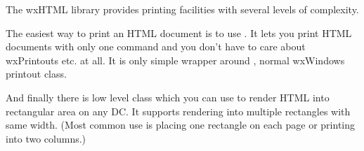 \label{printing}

The wxHTML library provides printing facilities with several levels of complexity. 

The easiest way to print an HTML document is to use 
. It lets you print HTML documents with only one 
command and you don't have to care about wxPrintouts etc. at all. It is only simple wrapper around 
, normal wxWindows printout class.


And finally there is low level class  which you can use to 
render HTML into rectangular area on any DC. It supports rendering into multiple rectangles with same 
width. (Most common use is placing one rectangle on each page or printing into two columns.)

